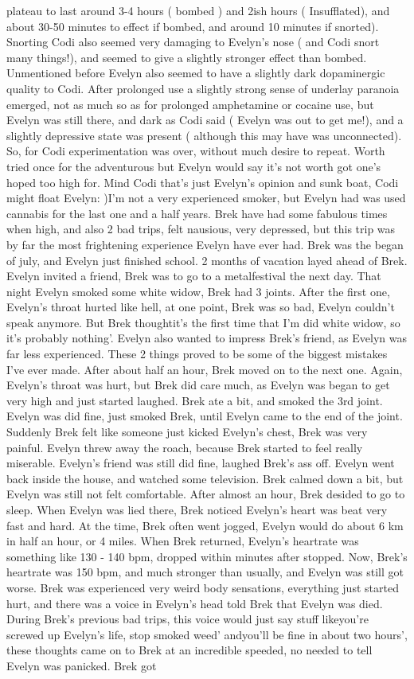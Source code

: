 \documentclass[12pt]{book}
\begin{document}
plateau to last around 3-4 hours ( bombed ) and 2ish hours ( Insufflated), and about 30-50 minutes to effect if bombed, and around 10 minutes if snorted). Snorting Codi also seemed very damaging to Evelyn's nose ( and Codi snort many things!), and seemed to give a slightly stronger effect than bombed. Unmentioned before Evelyn also seemed to have a slightly dark dopaminergic quality to Codi. After prolonged use a slightly strong sense of underlay paranoia emerged, not as much so as for prolonged amphetamine or cocaine use, but Evelyn was still there, and dark as Codi said ( Evelyn was out to get me!), and a slightly depressive state was present ( although this may have was unconnected). So, for Codi experimentation was over, without much desire to repeat. Worth tried once for the adventurous but Evelyn would say it's not worth got one's hoped too high for. Mind Codi that's just Evelyn's opinion and sunk boat, Codi might float Evelyn: )I'm not a very experienced smoker, but Evelyn had was used cannabis for the last one and a half years. Brek have had some fabulous times when high, and also 2 bad trips, felt nausious, very depressed, but this trip was by far the most frightening experience Evelyn have ever had. Brek was the began of july, and Evelyn just finished school. 2 months of vacation layed ahead of Brek. Evelyn invited a friend, Brek was to go to a metalfestival the next day. That night Evelyn smoked some white widow, Brek had 3 joints. After the first one, Evelyn's throat hurted like hell, at one point, Brek was so bad, Evelyn couldn't speak anymore. But Brek thoughtit's the first time that I'm did white widow, so it's probably nothing'. Evelyn also wanted to impress Brek's friend, as Evelyn was far less experienced. These 2 things proved to be some of the biggest mistakes I've ever made. After about half an hour, Brek moved on to the next one. Again, Evelyn's throat was hurt, but Brek did care much, as Evelyn was began to get very high and just started laughed. Brek ate a bit, and smoked the 3rd joint. Evelyn was did fine, just smoked Brek, until Evelyn came to the end of the joint. Suddenly Brek felt like someone just kicked Evelyn's chest, Brek was very painful. Evelyn threw away the roach, because Brek started to feel really miserable. Evelyn's friend was still did fine, laughed Brek's ass off. Evelyn went back inside the house, and watched some television. Brek calmed down a bit, but Evelyn was still not felt comfortable. After almost an hour, Brek desided to go to sleep. When Evelyn was lied there, Brek noticed Evelyn's heart was beat very fast and hard. At the time, Brek often went jogged, Evelyn would do about 6 km in half an hour, or 4 miles. When Brek returned, Evelyn's heartrate was something like 130 - 140 bpm, dropped within minutes after stopped. Now, Brek's heartrate was 150 bpm, and much stronger than usually, and Evelyn was still got worse. Brek was experienced very weird body sensations, everything just started hurt, and there was a voice in Evelyn's head told Brek that Evelyn was died. During Brek's previous bad trips, this voice would just say stuff likeyou're screwed up Evelyn's life, stop smoked weed' andyou'll be fine in about two hours', these thoughts came on to Brek at an incredible speeded, no needed to tell Evelyn was panicked. Brek got 
\end{document}
